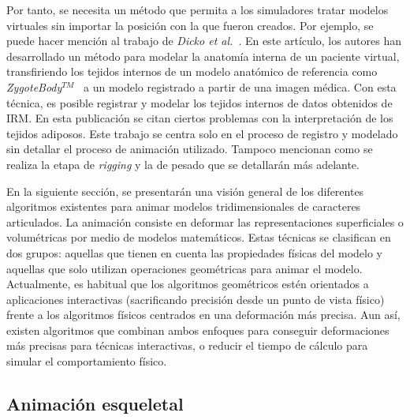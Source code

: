 Por tanto, se necesita un método que permita a los simuladores tratar modelos virtuales sin importar la posición con la que fueron creados. %
Por ejemplo, se puede hacer mención al trabajo de  \emph{Dicko et al.}~\cite{Ali2013}.  En este artículo, los autores han desarrollado un método para modelar la anatomía interna de un paciente virtual, transfiriendo los tejidos internos de un modelo anatómico de referencia como \emph{ZygoteBody}$^{TM}$~\cite{kelc2012zygote} a un modelo registrado a partir de una imagen médica. Con esta técnica, es posible registrar y modelar los tejidos internos de datos obtenidos de \ac{IRM}. En esta publicación se citan ciertos problemas con la interpretación de los tejidos adiposos. Este trabajo se centra solo en el proceso de registro y modelado sin detallar el proceso de animación utilizado. Tampoco mencionan como se realiza la etapa de \emph{rigging} y la de pesado que se detallarán más adelante.  


En la siguiente sección, se presentarán una visión general de los diferentes algoritmos existentes para animar modelos tridimensionales de caracteres articulados. La animación consiste en deformar las representaciones superficiales 
o volumétricas por medio de modelos matemáticos. Estas técnicas se clasifican en dos grupos: aquellas que tienen en cuenta las propiedades físicas del modelo y aquellas que solo utilizan operaciones geométricas para animar el modelo. Actualmente, es habitual que los algoritmos geométricos estén orientados a aplicaciones interactivas %
(sacrificando precisión desde un punto de vista físico) frente a los algoritmos físicos centrados en una deformación más precisa. Aun así, existen algoritmos que combinan ambos enfoques para conseguir deformaciones más precisas para técnicas interactivas, o reducir el tiempo de cálculo para simular el comportamiento físico. 


\subsection{Animación esqueletal}
\label{art:animation}
\label{art:virtualskel}

